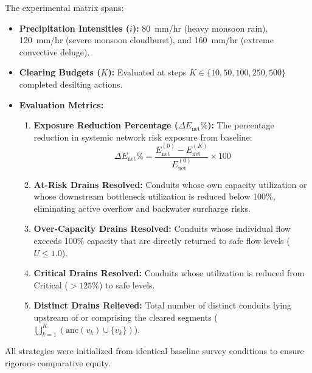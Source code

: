The experimental matrix spans:
\begin{itemize}
    \item \textbf{Precipitation Intensities ($i$):} 80~mm/hr (heavy monsoon rain), 120~mm/hr (severe monsoon cloudburst), and 160~mm/hr (extreme convective deluge).
    \item \textbf{Clearing Budgets ($K$):} Evaluated at steps $K \in \{10, 50, 100, 250, 500\}$ completed desilting actions.
    \item \textbf{Evaluation Metrics:}
    \begin{enumerate}
        \item \textbf{Exposure Reduction Percentage ($\Delta E_{\text{net}}\%$):} The percentage reduction in systemic network risk exposure from baseline:
        \begin{equation}
        \Delta E_{\text{net}}\% = \frac{E_{\text{net}}^{(0)} - E_{\text{net}}^{(K)}}{E_{\text{net}}^{(0)}} \times 100
        \end{equation}
        \item \textbf{At-Risk Drains Resolved:} Conduits whose own capacity utilization or whose downstream bottleneck utilization is reduced below 100\%, eliminating active overflow and backwater surcharge risks.
        \item \textbf{Over-Capacity Drains Resolved:} Conduits whose individual flow exceeds 100\% capacity that are directly returned to safe flow levels ($U \le 1.0$).
        \item \textbf{Critical Drains Resolved:} Conduits whose utilization is reduced from Critical ($> 125\%$) to safe levels.
        \item \textbf{Distinct Drains Relieved:} Total number of distinct conduits lying upstream of or comprising the cleared segments ($\bigcup_{k=1}^K (\text{anc}(v_k) \cup \{v_k\})$).
    \end{enumerate}
\end{itemize}
All strategies were initialized from identical baseline survey conditions to ensure rigorous comparative equity.
